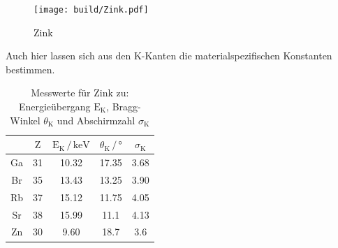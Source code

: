 \begin{figure}[H]
  \centering
  \texttt{[image: build/Zink.pdf]}
  \caption{Zink}
  \label{fig:Zink}
\end{figure}
Auch hier lassen sich aus den K-Kanten die materialspezifischen Konstanten bestimmen.
\begin{table}[H]
  \centering
  \caption{Messwerte für Zink zu: Energieübergang $\text{E}_\text{K}$, Bragg-Winkel $\theta_\text{K}$ und Abschirmzahl $\sigma_\text{K}$}
  \label{tab:mess}
  \begin{tabular}{c c c c c}
  \toprule
       & $\text{Z}$ & $\text{E}_\text{K} \,/\, \mathrm{keV}$ & $\theta_\text{K} \,/\, ° $ & $\sigma_\text{K} $\\
  \midrule 
    Ga & 31 & 10.32 & 17.35 & 3.68 \\
    Br & 35 & 13.43 & 13.25 & 3.90 \\
    Rb & 37 & 15.12 & 11.75 & 4.05 \\
    Sr & 38 & 15.99 & 11.1 & 4.13 \\
    Zn & 30 & 9.60  & 18.7 & 3.6 \\
  \bottomrule
  \end{tabular}
  \end{table}
\noindent
  
